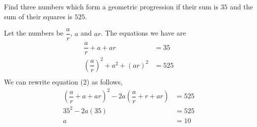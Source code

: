 

\question[2] Find three numbers which form a geometric progression if their sum is $35$ and the sum of their squares is $525$.


\ifprintanswers
\fi 

\begin{solution}[\halfpage]
  Let the numbers be $\dfrac{a}{r}$, $a$ and $ar$. The equations we have are
  \begin{align}
    \dfrac{a}{r} + a + ar           &= 35 \\
    (\dfrac{a}{r})^2 + a^2 + (ar)^2 &= 525 \\
  \end{align}
  We can rewrite equation (2) as follows,
  \begin{align}
    (\dfrac{a}{r} + a + ar)^2 - 2a(\dfrac{a}{r} + r + ar) &= 525 \\
    35^2 - 2a(35)                                         &= 525 \\
    a                                                     &= 10
  \end{align}
    

\end{solution}
